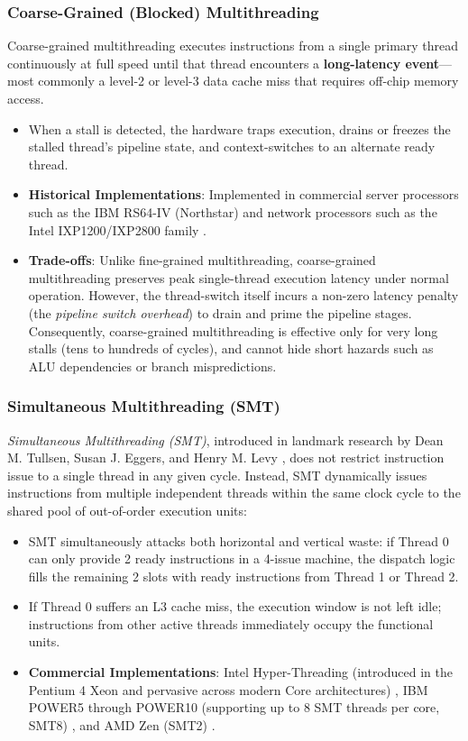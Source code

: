\subsubsection{Coarse-Grained (Blocked) Multithreading}
Coarse-grained multithreading executes instructions from a single primary thread continuously at full speed until that thread encounters a \textbf{long-latency event}---most commonly a level-2 or level-3 data cache miss that requires off-chip memory access.
\begin{itemize}
    \item When a stall is detected, the hardware traps execution, drains or freezes the stalled thread's pipeline state, and context-switches to an alternate ready thread.
    \item \textbf{Historical Implementations}: Implemented in commercial server processors such as the IBM RS64-IV (Northstar) \cite{borkenhagen2000multithreaded} and network processors such as the Intel IXP1200/IXP2800 family \cite{johnson2002ixp}.
    \item \textbf{Trade-offs}: Unlike fine-grained multithreading, coarse-grained multithreading preserves peak single-thread execution latency under normal operation. However, the thread-switch itself incurs a non-zero latency penalty (the \emph{pipeline switch overhead}) to drain and prime the pipeline stages. Consequently, coarse-grained multithreading is effective only for very long stalls (tens to hundreds of cycles), and cannot hide short hazards such as ALU dependencies or branch mispredictions.
\end{itemize}

\subsubsection{Simultaneous Multithreading (SMT)}
\textit{Simultaneous Multithreading (SMT)}, introduced in landmark research by Dean M. Tullsen, Susan J. Eggers, and Henry M. Levy \cite{tullsen1995simultaneous}, does not restrict instruction issue to a single thread in any given cycle. Instead, SMT dynamically issues instructions from multiple independent threads within the same clock cycle to the shared pool of out-of-order execution units:
\begin{itemize}
    \item SMT simultaneously attacks both horizontal and vertical waste: if Thread 0 can only provide 2 ready instructions in a 4-issue machine, the dispatch logic fills the remaining 2 slots with ready instructions from Thread 1 or Thread 2.
    \item If Thread 0 suffers an L3 cache miss, the execution window is not left idle; instructions from other active threads immediately occupy the functional units.
    \item \textbf{Commercial Implementations}: Intel Hyper-Threading (introduced in the Pentium 4 Xeon and pervasive across modern Core architectures) \cite{marr2002hyperthreading}, IBM POWER5 through POWER10 (supporting up to 8 SMT threads per core, SMT8) \cite{kalla2004power5}, and AMD Zen (SMT2) \cite{singh2017zen}.
\end{itemize}


